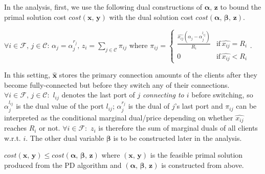 \documentclass[10pt]{llncs}
\begin{document}
In the analysis, first, we use the following dual constructions of
$\boldsymbol{\alpha},\,\boldsymbol{z}$ to bound the primal solution
cost $cost\left(\boldsymbol{x},\,\boldsymbol{y}\right)$ with the
dual solution cost $cost\left(\boldsymbol{\alpha},\,\boldsymbol{\beta},\,\boldsymbol{z}\right)$.

$\forall i\in\mathcal{F},\, j\in\mathcal{C}:\,\alpha_{j}=\alpha_{j}^{r_{j}},\, z_{i}=\sum_{j\in\mathcal{C}}\pi_{ij}$
where $\pi_{ij}=\begin{cases}
\frac{\hat{x_{ij}}\left(\alpha_{j}-\alpha_{j}^{l_{ij}}\right)}{R_{i}} & \textrm{if}\,\hat{x_{ij}}=R_{i}\\
0 & \textrm{if}\,\hat{x_{ij}}<R_{i}
\end{cases}$.

\medskip{}


In this setting, \textcolor{black}{$\boldsymbol{\hat{x}}$} stores
the primary connection amounts of the clients after they become fully-connected
but before they switch any of their connections. $\forall i\in\mathcal{F},\, j\in\mathcal{C}:$
$l_{ij}$ denotes the last port of $j$ \textit{connecting to $i$}
before switching, so $\alpha_{j}^{l_{ij}}$ is the dual value of the
port $l_{ij}$; $\alpha_{j}^{r_{j}}$ is the dual of $j$'s last port
and $\pi_{ij}$ can be interpreted as the conditional marginal dual/price
depending on whether $\hat{x_{ij}}$ reaches $R_{i}$ or not. $\forall i\in\mathcal{F}:$
$z_{i}$ is therefore the sum of marginal duals of all clients w.r.t.
$i$. The other dual variable $\boldsymbol{\beta}$ is to be constructed
later in the analysis.
\begin{lemma}
$cost\left(\boldsymbol{x},\,\boldsymbol{y}\right)\leq cost\left(\boldsymbol{\alpha},\,\boldsymbol{\beta},\,\boldsymbol{z}\right)$
where $\left(\boldsymbol{x},\,\boldsymbol{y}\right)$ is the feasible
primal solution produced from the PD algorithm and $\left(\boldsymbol{\alpha},\,\boldsymbol{\beta},\,\boldsymbol{z}\right)$
is constructed from above. \label{lem: pdb}\end{lemma}
\end{document}
